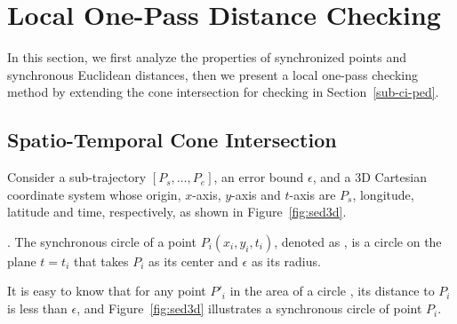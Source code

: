 \section{Local One-Pass Distance Checking}

In this section, we first analyze the properties of synchronized points and synchronous Euclidean distances, then we present a local one-pass \sed checking method by extending the cone intersection for \ped checking in Section~\ref{sub-ci-ped}.




\subsection{Spatio-Temporal Cone Intersection}

Consider a sub-trajectory $[P_s, \ldots, P_e]$, an error bound $\epsilon$, and a 3D Cartesian coordinate system whose origin, $x$-axis, $y$-axis and $t$-axis  are $P_s$, longitude, latitude and time, respectively, as shown in Figure~\ref{fig:sed3d}.



. The synchronous circle of a point $P_i(x_i, y_i, t_i)$, denoted as , is a circle on the plane $t=t_i$ that takes $P_i$ as its center and $\epsilon$ as its radius.


It is easy to know that for any point $P'_i$ in the area of a circle , its distance to $P_i$ is less than $\epsilon$,
and Figure~\ref{fig:sed3d} illustrates a synchronous circle  of point $P_i$.



